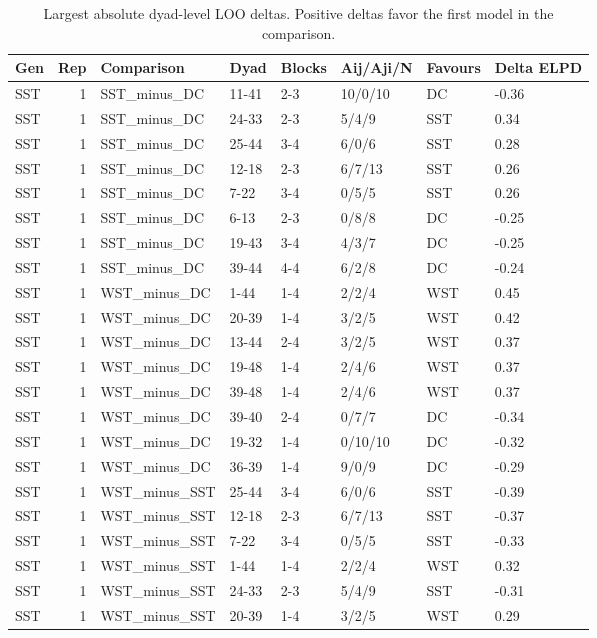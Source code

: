 \begin{table}[!h]
\centering
\caption{Largest absolute dyad-level LOO deltas. Positive deltas favor the first model in the comparison.}
\centering
\begin{tabular}[t]{lrllllll}
\toprule
Gen & Rep & Comparison & Dyad & Blocks & Aij/Aji/N & Favours & Delta ELPD\\
\midrule
SST & 1 & SST_minus_DC & 11-41 & 2-3 & 10/0/10 & DC & -0.36\\
SST & 1 & SST_minus_DC & 24-33 & 2-3 & 5/4/9 & SST & 0.34\\
SST & 1 & SST_minus_DC & 25-44 & 3-4 & 6/0/6 & SST & 0.28\\
SST & 1 & SST_minus_DC & 12-18 & 2-3 & 6/7/13 & SST & 0.26\\
SST & 1 & SST_minus_DC & 7-22 & 3-4 & 0/5/5 & SST & 0.26\\
\addlinespace
SST & 1 & SST_minus_DC & 6-13 & 2-3 & 0/8/8 & DC & -0.25\\
SST & 1 & SST_minus_DC & 19-43 & 3-4 & 4/3/7 & DC & -0.25\\
SST & 1 & SST_minus_DC & 39-44 & 4-4 & 6/2/8 & DC & -0.24\\
SST & 1 & WST_minus_DC & 1-44 & 1-4 & 2/2/4 & WST & 0.45\\
SST & 1 & WST_minus_DC & 20-39 & 1-4 & 3/2/5 & WST & 0.42\\
\addlinespace
SST & 1 & WST_minus_DC & 13-44 & 2-4 & 3/2/5 & WST & 0.37\\
SST & 1 & WST_minus_DC & 19-48 & 1-4 & 2/4/6 & WST & 0.37\\
SST & 1 & WST_minus_DC & 39-48 & 1-4 & 2/4/6 & WST & 0.37\\
SST & 1 & WST_minus_DC & 39-40 & 2-4 & 0/7/7 & DC & -0.34\\
SST & 1 & WST_minus_DC & 19-32 & 1-4 & 0/10/10 & DC & -0.32\\
\addlinespace
SST & 1 & WST_minus_DC & 36-39 & 1-4 & 9/0/9 & DC & -0.29\\
SST & 1 & WST_minus_SST & 25-44 & 3-4 & 6/0/6 & SST & -0.39\\
SST & 1 & WST_minus_SST & 12-18 & 2-3 & 6/7/13 & SST & -0.37\\
SST & 1 & WST_minus_SST & 7-22 & 3-4 & 0/5/5 & SST & -0.33\\
SST & 1 & WST_minus_SST & 1-44 & 1-4 & 2/2/4 & WST & 0.32\\
\addlinespace
SST & 1 & WST_minus_SST & 24-33 & 2-3 & 5/4/9 & SST & -0.31\\
SST & 1 & WST_minus_SST & 20-39 & 1-4 & 3/2/5 & WST & 0.29\\

\end{tabular}
\end{table}
